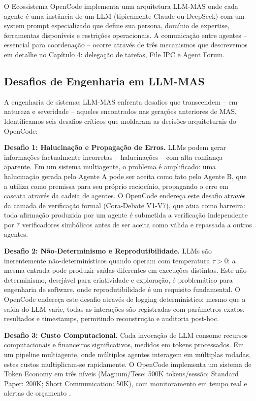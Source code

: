 \documentclass[12pt,a4paper,sumario=tradicional,openany]{abntex2}
\begin{document}
O Ecossistema OpenCode implementa uma arquitetura LLM-MAS onde cada agente é uma instância de um LLM (tipicamente Claude ou DeepSeek) com um system prompt especializado que define sua persona, domínio de expertise, ferramentas disponíveis e restrições operacionais. A comunicação entre agentes -- essencial para coordenação -- ocorre através de três mecanismos que descrevemos em detalhe no Capítulo 4: delegação de tarefas, File IPC e Agent Forum.

\subsection{Desafios de Engenharia em LLM-MAS}

A engenharia de sistemas LLM-MAS enfrenta desafios que transcendem -- em natureza e severidade -- aqueles encontrados nas gerações anteriores de MAS. Identificamos seis desafios críticos que moldaram as decisões arquiteturais do OpenCode:

\textbf{Desafio 1: Halucinação e Propagação de Erros.} LLMs podem gerar informações
factualmente incorretas -- halucinações -- com alta confiança aparente. Em um sistema
multiagente, o problema é amplificado: uma halucinação gerada pelo Agente A pode ser
aceita como fato pelo Agente B, que a utiliza como premissa para seu próprio raciocínio,
propagando o erro em cascata através da cadeia de agentes. O OpenCode endereça este
desafio através da camada de verificação formal (Cora-Debate V1-V7), que atua como
barreira: toda afirmação produzida por um agente é submetida a verificação independente
por 7 verificadores simbólicos antes de ser aceita como válida e repassada a outros
agentes.

\textbf{Desafio 2: Não-Determinismo e Reprodutibilidade.} LLMs são inerentemente
não-determinísticos quando operam com temperatura $\tau > 0$: a mesma entrada pode
produzir saídas diferentes em execuções distintas. Este não-determinismo, desejável
para criatividade e exploração, é problemático para engenharia de software, onde
reprodutibilidade é um requisito fundamental. O OpenCode endereça este desafio
através de logging determinístico: mesmo que a saída do LLM varie, todas as
interações são registradas com parâmetros exatos, resultados e timestamps,
permitindo reconstrução e auditoria post-hoc.

\textbf{Desafio 3: Custo Computacional.} Cada invocação de LLM consome recursos
computacionais e financeiros significativos, medidos em tokens processados. Em um
pipeline multiagente, onde múltiplos agentes interagem em múltiplas rodadas, estes
custos multiplicam-se rapidamente. O OpenCode implementa um sistema de Token Economy
em três níveis (Magnum/Tese: 500K tokens/sessão; Standard Paper: 200K;
Short Communication: 50K), com monitoramento em tempo real e alertas de orçamento
\cite{kodumagulla2026engineering}.
\end{document}
